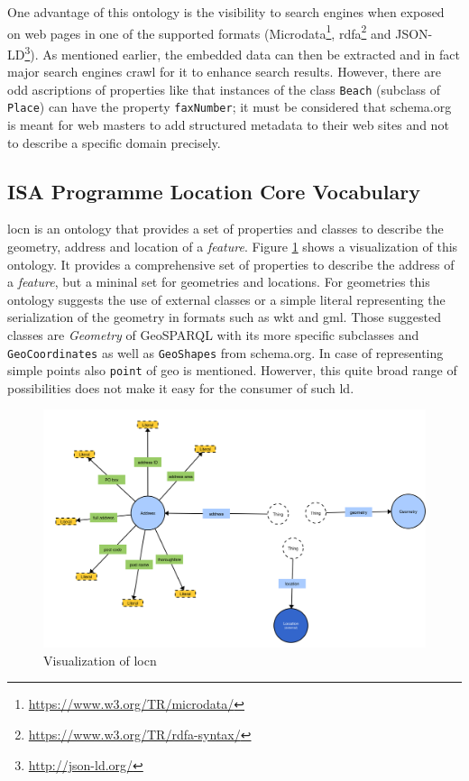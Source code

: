 \documentclass[draft,final]{vutinfth} %
\begin{document}
One advantage of this ontology is the visibility to search engines when exposed on web pages in one of the supported formats (Microdata\footnote{\url{https://www.w3.org/TR/microdata/}}, \gls{rdfa}\footnote{\url{https://www.w3.org/TR/rdfa-syntax/}} and JSON-LD\footnote{\url{http://json-ld.org/}}). As mentioned earlier, the embedded data can then be extracted and in fact major search engines crawl for it to enhance search results\cite{haas_enhanced_2011}. However, there are odd ascriptions of properties like that instances of the class \texttt{Beach} (subclass of \texttt{Place}) can have the property \texttt{faxNumber}; it must be considered that schema.org is meant for web masters to add structured metadata to their web sites \cite{veres_schema.org_2013} and not to describe a specific domain precisely.

\subsection{ISA Programme Location Core Vocabulary}
\gls{locn} is an ontology that provides a set of properties and classes to describe the geometry, address and location of a \textit{feature}. Figure \ref{fig:related-work-geospatial-ontologies:locn} shows a visualization of this ontology. It provides a comprehensive set of properties to describe the address of a \textit{feature}, but a mininal set for geometries and locations. For geometries this ontology suggests the use of external classes or a simple literal representing the serialization of the geometry in formats such as \gls{wkt} and \gls{gml}. Those suggested classes are \textit{Geometry} of GeoSPARQL with its more specific subclasses and \texttt{GeoCoordinates} as well as \texttt{GeoShapes} from schema.org. In case of representing simple points also \texttt{point} of \gls{geo} is mentioned. \cite{perego_isa_2015} Howerver, this quite broad range of possibilities does not make it easy for the consumer of such \gls{ld}.

\begin{figure}[h]
    \centering
    \includegraphics[width=1.0\textwidth]{graphics/vocabularies/locn.png}
    \caption{Visualization of \gls{locn}}
    \label{fig:related-work-geospatial-ontologies:locn}
\end{figure}
\end{document}
